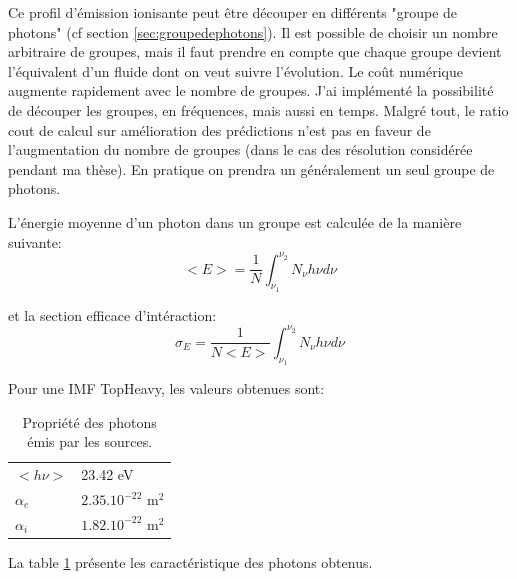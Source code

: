 Ce profil d’émission ionisante peut être découper en différents "groupe de photons" (cf section \ref{sec:groupedephotons}).
Il est possible de choisir un nombre arbitraire de groupes, mais il faut prendre en compte que chaque groupe devient l'équivalent d'un fluide dont on veut suivre l'évolution.
Le coût numérique augmente rapidement avec le nombre de groupes. 
J'ai implémenté la possibilité de découper les groupes, en fréquences, mais aussi en temps.
Malgré tout, le ratio cout de calcul sur amélioration des prédictions n'est pas en faveur de l'augmentation du nombre de groupes (dans le cas des résolution considérée pendant ma thèse).
En pratique on prendra un généralement un seul groupe de photons.

L’énergie moyenne d'un photon dans un groupe est calculée de la manière suivante:
\begin{equation}
<E> = \frac{1}{N} \int_{\nu_1}^{\nu_2} N_\nu h \nu d\nu
\end{equation}

et la section efficace d'intéraction:
\begin{equation}
\sigma_E = \frac{1}{N<E>} \int_{\nu_1}^{\nu_2} N_\nu h \nu d\nu
\end{equation}

Pour une IMF TopHeavy, les valeurs obtenues sont:


\begin{table}
\begin{tabular}{l l }
	$<h\nu>$	&  23.42 eV \\
	$\alpha_e$	&  $2.35.10^{-22}$ m$^2$ \\
	$\alpha_i$	&  $1.82.10^{-22}$ m$^2$ \\
\end{tabular}
\caption{Propriété des photons émis par les sources.
\label{tab_photon}}
\end{table}

La table \ref{tab_photon} présente les caractéristique des photons obtenus.






%


